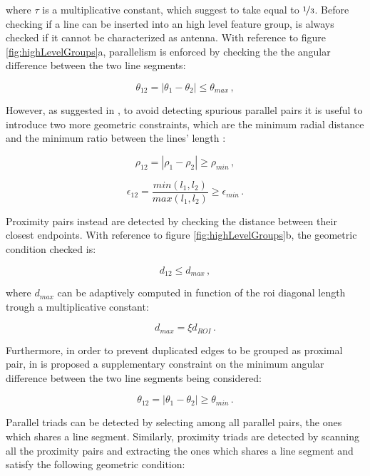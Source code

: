 where $\tau$ is a multiplicative constant, which \cite{Sharma2018} suggest to take equal to $\nicefrac{1}{3}$. Before checking if a line can be inserted into an high level feature group, is always checked if it cannot be characterized as antenna.
With reference to figure \ref{fig:highLevelGroups}a, parallelism is enforced by checking the the angular difference between the two line segments:

\begin{equation}
\theta_{12} = |\theta_1 - \theta_2| \leqslant \theta_{max} \,,
\end{equation}

However, as suggested in \cite{fracchio2019}, to avoid detecting spurious parallel pairs it is useful to introduce two more geometric constraints, which are the minimum radial distance and the minimum ratio between the lines' length :

\begin{equation}
\rho_{12} = |\rho_1 - \rho_2| \geq	\rho_{min} \,,
\end{equation}

\begin{equation}
\epsilon_{12} = \frac{min(l_1,l_2)}{max(l_1,l_2)} \geq \epsilon_{min} \,.
\end{equation}

Proximity pairs instead are detected by checking the distance between their closest endpoints. With reference to figure  \ref{fig:highLevelGroups}b, the geometric condition checked is: 

\begin{equation}
d_{12} \leqslant d_{max} \,,
\end{equation}

where $d_{max}$ can be adaptively computed in function of the \acrshort{roi} diagonal length trough a multiplicative constant:

\begin{equation}
d_{max} = \xi d_{ROI} \,.
\end{equation}

Furthermore, in order to prevent duplicated edges to be grouped as proximal pair, in \cite{fracchio2019} is proposed a supplementary constraint on the minimum angular difference between the two line segments being considered: 

\begin{equation}
\theta_{12} = |\theta_1 - \theta_2| \geq \theta_{min} \,.
\end{equation}

Parallel triads can be detected by selecting among all parallel pairs, the ones which shares a line segment. Similarly, proximity triads are detected by scanning all the proximity pairs and extracting the ones which shares a line segment and satisfy the following geometric condition:

